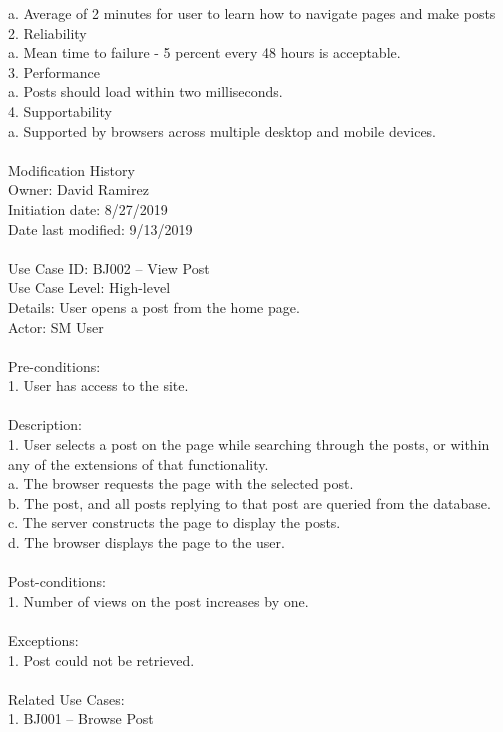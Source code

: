 \documentclass{report}
\begin{document}
	a.	Average of 2 minutes for user to learn how to navigate pages and make posts\\
2.	Reliability\\
	a.	Mean time to failure - 5 percent every 48 hours is acceptable.\\
3.	Performance\\
	a.	Posts should load within two milliseconds.\\
4.	Supportability\\
	a.	Supported by browsers across multiple desktop and mobile devices.\\
\\
Modification History\\
     Owner: David Ramirez\\
     Initiation date: 8/27/2019\\
     Date last modified: 9/13/2019\\
\\
Use Case ID: BJ002 – View Post\\
Use Case Level: High-level\\
Details: User opens a post from the home page.\\
Actor: SM User\\
\\
Pre-conditions:\\
1.	User has access to the site.\\
\\
Description: \\
1. User selects a post on the page while searching through the posts, or within any of the extensions of that functionality.\\
a.	The browser requests the page with the selected post.\\
b.	The post, and all posts replying to that post are queried from the database.\\
c.	The server constructs the page to display the posts.\\
d.	The browser displays the page to the user.\\
\\
Post-conditions: \\
1.	Number of views on the post increases by one.\\
\\
Exceptions: \\
1.	Post could not be retrieved.\\
\\
Related Use Cases: \\
1.	BJ001 – Browse Post\\
\end{document}
